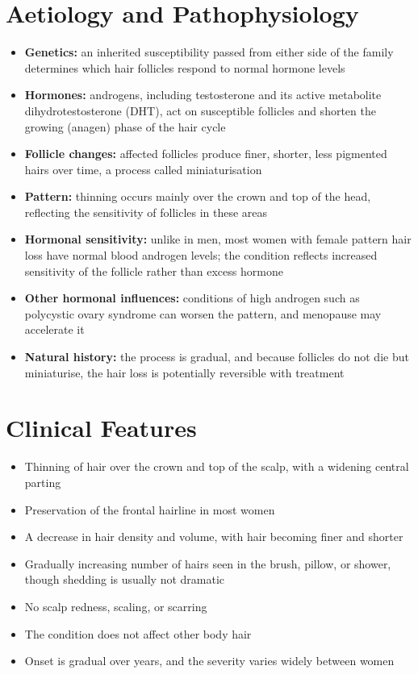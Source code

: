 \section*{Aetiology and Pathophysiology}
\begin{itemize}
    \item \textbf{Genetics:} an inherited susceptibility passed from either side of the family determines which hair follicles respond to normal hormone levels
    \item \textbf{Hormones:} androgens, including testosterone and its active metabolite dihydrotestosterone (DHT), act on susceptible follicles and shorten the growing (anagen) phase of the hair cycle
    \item \textbf{Follicle changes:} affected follicles produce finer, shorter, less pigmented hairs over time, a process called miniaturisation
    \item \textbf{Pattern:} thinning occurs mainly over the crown and top of the head, reflecting the sensitivity of follicles in these areas
    \item \textbf{Hormonal sensitivity:} unlike in men, most women with female pattern hair loss have normal blood androgen levels; the condition reflects increased sensitivity of the follicle rather than excess hormone
    \item \textbf{Other hormonal influences:} conditions of high androgen such as polycystic ovary syndrome can worsen the pattern, and menopause may accelerate it
    \item \textbf{Natural history:} the process is gradual, and because follicles do not die but miniaturise, the hair loss is potentially reversible with treatment
\end{itemize}

\section*{Clinical Features}
\begin{itemize}
    \item Thinning of hair over the crown and top of the scalp, with a widening central parting
    \item Preservation of the frontal hairline in most women
    \item A decrease in hair density and volume, with hair becoming finer and shorter
    \item Gradually increasing number of hairs seen in the brush, pillow, or shower, though shedding is usually not dramatic
    \item No scalp redness, scaling, or scarring
    \item The condition does not affect other body hair
    \item Onset is gradual over years, and the severity varies widely between women
\end{itemize}

